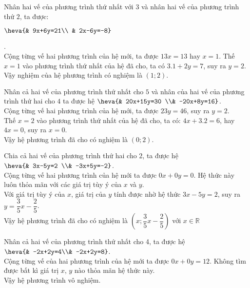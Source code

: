 \begin{vd}
{\begin{listEX}
	\item
	Nhân hai vế của phương trình thứ nhất với $3$ và nhân hai vế của phương trình thứ $2$, ta được:\\
	\centerline{$\heva{& 9x+6y=21\\ & 2x-6y=-8}$}.\\
	Cộng từng vế hai phương trình của hệ mới, ta được $13x=13$ hay $x=1$.
	Thế $x=1$ vào phương trình thứ nhất của hệ đã cho, ta có $3.1+2y=7$, suy ra $y=2$. \\
	Vậy nghiệm của hệ phương trình có nghiệm là $(1;2)$.
	\item
	Nhân cả hai vế của phương trình thứ nhất cho $5$ và nhân của hai vế của phương trình thứ hai cho $4$ ta được hệ $\heva{& 20x+15y=30 \\& -20x+8y=16}$.\\
	Cộng từng vế hai phương trình của hệ mới, ta được $23y=46$, suy ra $y=2$. \\
	Thế $x=2$ vào phương trình thứ nhất của hệ đã cho, ta có: $4x+3.2=6$, hay $4x=0$, suy ra $x=0$.\\
	Vậy hệ phương trình đã cho có nghiệm là $(0;2)$.
	\item 
	Chia cả hai vế của phương trình thứ hai cho $2$, ta được hệ $\heva{& 3x-5y=2 \\& -3x+5y=-2}$.\\
	Cộng từng vế hai phương trình của hệ mới ta được $0x+0y=0$. Hệ thức này luôn thỏa mãn với các giá trị tùy ý của $x$ và $y$.\\
	Với giá trị tùy ý của $x$, giá trị của $y$ tính được nhờ hệ thức $3x-5y=2$, suy ra $y=\dfrac{3}{5}x-\dfrac{2}{5}$.\\
	Vậy hệ phương trình đã cho có nghiệm là $(x;\dfrac{3}{5}x-\dfrac{2}{5})$ với $x\in\mathbb{R}$
	\item
	Nhân cả hai vế của phương trình thứ nhất cho 4, ta được hệ $\heva{& -2x+2y=4\\& -2x+2y=8}$.\\
	Cộng từng vế của hai phương trình của hệ mới ta được $0x+0y=12$. Không tìm được bất kì giá trị $x$, $y$ nào thỏa mãn hệ thức này.\\
	Vậy hệ phương trình vô nghiệm.
	\end{listEX}
	}
\end{vd}
